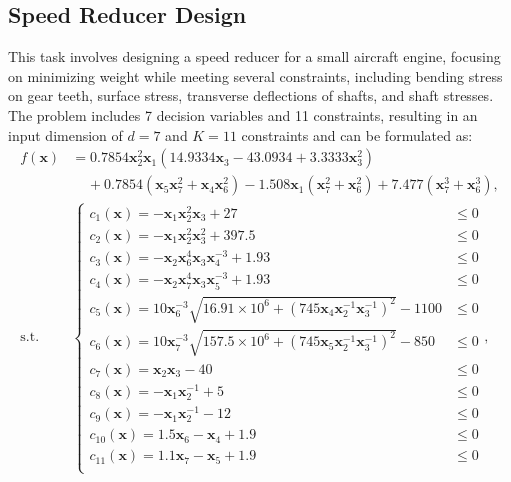     
 \subsection{Speed Reducer Design}
\label{section:neural-cbo_speed}
This task involves designing a speed reducer for a small aircraft engine, focusing on minimizing weight while meeting several constraints, including bending stress on gear teeth, surface stress, transverse deflections of shafts, and shaft stresses. The problem includes 7 decision variables and 11 constraints, resulting in an input dimension of $d=7$ and $K=11$ constraints and can be formulated as:
\begin{align*}
    f(\mathbf{x}) &= 0.7854\mathbf{x}_2
^2 \mathbf{x}_1(14.9334\mathbf{x}_3 - 43.0934 + 3.3333\mathbf{x}_3^2) 
\\
    & \;\;\;\; +0.7854(\mathbf{x}_5\mathbf{x}_7^2 + \mathbf{x}_4\mathbf{x}_6^2) - 1.508\mathbf{x}_1(\mathbf{x}_7^2 + \mathbf{x}_6^2) + 7.477(\mathbf{x}_7^3 + \mathbf{x}_6^3), 
    \\
    \text{s.t. } & \begin{cases} 
    c_1(\mathbf{x}) = -\mathbf{x}_1\mathbf{x}_2^2\mathbf{x}_3 + 27  & \le 0 
    \\
    c_2(\mathbf{x}) = -\mathbf{x}_1\mathbf{x}_2^2\mathbf{x}_3^2 + 397.5 & \le 0 
    \\
    c_3(\mathbf{x}) = -\mathbf{x}_2\mathbf{x}_6^4
    \mathbf{x}_3\mathbf{x}_4^{-3}+ 1.93 &\le 0 
    \\
    c_4(\mathbf{x}) = -\mathbf{x}_2\mathbf{x}_7^4
    \mathbf{x}_3\mathbf{x}_5^{-3}+ 1.93 & \le 0 
    \\
    c_5(\mathbf{x}) = 10\mathbf{x}_6^{-3} \sqrt{16.91 \times 10^6 + (745\mathbf{x}_4\mathbf{x}_2^{-1}
    \mathbf{x}_3^{-1}
    )^2} -1100 & \le 0
    \\
    c_6(\mathbf{x}) = 10\mathbf{x}_7^{-3} \sqrt{157.5 \times 10^6 + (745\mathbf{x}_5\mathbf{x}_2^{-1}
    \mathbf{x}_3^{-1}
    )^2} - 850 & \le 0
    \\
    c_7(\mathbf{x}) = \mathbf{x}_2\mathbf{x}_3 -40 & \le 0 
    \\
    c_8(\mathbf{x}) = -\mathbf{x}_1 \mathbf{x}_2^{-1} + 5 & \le 0
    \\
    c_9(\mathbf{x}) = -\mathbf{x}_1 \mathbf{x}_2^{-1} - 12  & \le 0
    \\
    c_{10}(\mathbf{x}) = 1.5\mathbf{x}_6 - \mathbf{x}_4  + 1.9  & \le 0
    \\
    c_{11}(\mathbf{x}) = 1.1\mathbf{x}_7 - \mathbf{x}_5  + 1.9  & \le 0
    \\
    \end{cases},
\end{align*}

